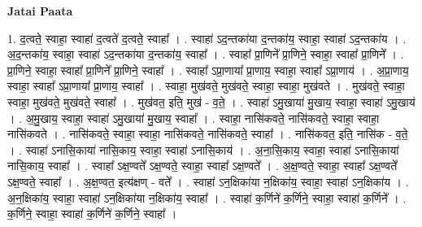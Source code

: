 \documentclass[17pt]{extarticle}
\begin{document}
\textbf{Jatai Paata} \newline

1. द॒त्वते॒ स्वाहा॒ स्वाहा॑ द॒त्वते॑ द॒त्वते॒ स्वाहा᳚ । . स्वाहा॑ ऽद॒न्तका॑या द॒न्तका॑य॒ स्वाहा॒ स्वाहा॑ ऽद॒न्तका॑य । . अ॒द॒न्तका॑य॒ स्वाहा॒ स्वाहा॑ ऽद॒न्तका॑या द॒न्तका॑य॒ स्वाहा᳚ । . स्वाहा᳚ प्रा॒णिने᳚ प्रा॒णिने॒ स्वाहा॒ स्वाहा᳚ प्रा॒णिने᳚ । . प्रा॒णिने॒ स्वाहा॒ स्वाहा᳚ प्रा॒णिने᳚ प्रा॒णिने॒ स्वाहा᳚ । . स्वाहा᳚ ऽप्रा॒णाया᳚ प्रा॒णाय॒ स्वाहा॒ स्वाहा᳚ ऽप्रा॒णाय॑ । . अ॒प्रा॒णाय॒ स्वाहा॒ स्वाहा᳚ ऽप्रा॒णाया᳚ प्रा॒णाय॒ स्वाहा᳚ । . स्वाहा॒ मुख॑वते॒ मुख॑वते॒ स्वाहा॒ स्वाहा॒ मुख॑वते । . मुख॑वते॒ स्वाहा॒ स्वाहा॒ मुख॑वते॒ मुख॑वते॒ स्वाहा᳚ । . मुख॑वत॒ इति॒ मुख॑ - व॒ते॒ । . स्वाहा॑ ऽमु॒खाया॑ मु॒खाय॒ स्वाहा॒ स्वाहा॑ ऽमु॒खाय॑ । . अ॒मु॒खाय॒ स्वाहा॒ स्वाहा॑ ऽमु॒खाया॑ मु॒खाय॒ स्वाहा᳚ । . स्वाहा॒ नासि॑कवते॒ नासि॑कवते॒ स्वाहा॒ स्वाहा॒ नासि॑कवते । . नासि॑कवते॒ स्वाहा॒ स्वाहा॒ नासि॑कवते॒ नासि॑कवते॒ स्वाहा᳚ । . नासि॑कवत॒ इति॒ नासि॑क - व॒ते॒ । . स्वाहा॑ ऽनासि॒काया॑ नासि॒काय॒ स्वाहा॒ स्वाहा॑ ऽनासि॒काय॑ । . अ॒ना॒सि॒काय॒ स्वाहा॒ स्वाहा॑ ऽनासि॒काया॑ नासि॒काय॒ स्वाहा᳚ । . स्वाहा᳚ ऽक्ष॒ण्वते᳚ ऽक्ष॒ण्वते॒ स्वाहा॒ स्वाहा᳚ ऽक्ष॒ण्वते᳚ । . अ॒क्ष॒ण्वते॒ स्वाहा॒ स्वाहा᳚ ऽक्ष॒ण्वते᳚ ऽक्ष॒ण्वते॒ स्वाहा᳚ । . अ॒क्ष॒ण्वत॒ इत्य॑क्षण् - वते᳚ । . स्वाहा॑ ऽन॒क्षिका॑या न॒क्षिका॑य॒ स्वाहा॒ स्वाहा॑ ऽन॒क्षिका॑य । . अ॒न॒क्षिका॑य॒ स्वाहा॒ स्वाहा॑ ऽन॒क्षिका॑या न॒क्षिका॑य॒ स्वाहा᳚ । . स्वाहा॑ क॒र्णिने॑ क॒र्णिने॒ स्वाहा॒ स्वाहा॑ क॒र्णिने᳚ । . क॒र्णिने॒ स्वाहा॒ स्वाहा॑ क॒र्णिने॑ क॒र्णिने॒ स्वाहा᳚ । \newline
\end{document}
